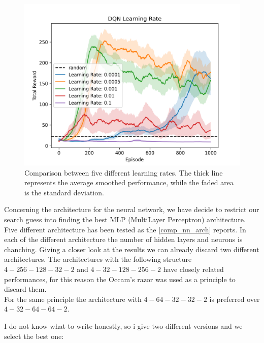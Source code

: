 \documentclass{article}
\begin{document}
\begin{figure}[ht!]
   \centering
   \includegraphics[width=\columnwidth]{assets/fig_hp/learning_rate.png}
   \caption{Comparison between five different learning rates. The thick line represents the average smoothed performance, while the faded area is the standard deviation. 
   }
   \label{fig:comp_learning_rate}
\end{figure}
 
   Concerning the architecture for the neural network, we have decide to restrict our search guess into finding the best MLP (MultiLayer Perceptron) architecture.
   Five different architecture has been tested as the \autoref{comp_nn_arch} reports. 
   In each of the different architecture the number of hidden layers and neurons is chanching. 
   Giving a closer look at the results we can already discard two different architectures. 
   The architectures with the following structure $4-256-128-32-2$ and $4-32-128-256-2$ have closely related performances, for this reason the Occam's razor was used as a principle to discard them.\\
   For the same principle the architecture with $4-64-32-32-2$ is preferred over $4-32-64-64-2$. 
   
   I do not know what to write honestly, so i give two different versions and we select the best one:\\
\end{document}
